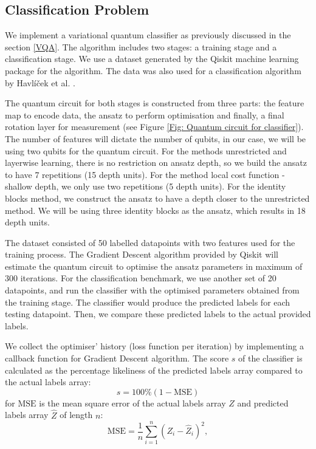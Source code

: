 \subsection{Classification Problem} \label{Sec: Classification Problem}
We implement a variational quantum classifier as previously discussed in the section \ref{VQA}.
The algorithm includes two stages: a training stage and a classification stage.
We use a dataset generated by the Qiskit machine learning package for the algorithm.
The data was also used for a classification algorithm by Havlíček et al. \cite{havlicekSupervisedLearningQuantumenhanced2019}.

The quantum circuit for both stages is constructed from three parts: the feature map to encode data, the ansatz to perform optimisation and finally, a final rotation layer for measurement (see Figure \ref{Fig: Quantum circuit for classifier}).
The number of features will dictate the number of qubits, in our case, we will be using two qubits for the quantum circuit.
For the methods unrestricted and layerwise learning, there is no restriction on ansatz depth, so we build the ansatz to have 7 repetitions (15 depth units).
For the method local cost function - shallow depth, we only use two repetitions (5 depth units).
For the identity blocks method, we construct the ansatz to have a depth closer to the unrestricted method. 
We will be using three identity blocks as the ansatz, which results in 18 depth units.

The dataset consisted of 50 labelled datapoints with two features used for the training process.
The Gradient Descent algorithm provided by Qiskit will estimate the quantum circuit to optimise the ansatz parameters in maximum of 300 iterations.
For the classification benchmark, we use another set of 20 datapoints, and run the classifier with the optimised parameters obtained from the training stage.
The classifier would produce the predicted labels for each testing datapoint.
Then, we compare these predicted labels to the actual provided labels.

We collect the optimiser' history (loss function per iteration) by implementing a callback function for Gradient Descent algorithm.
The score $s$ of the classifier is calculated as the percentage likeliness of the predicted labels array compared to the actual labels array:
\begin{equation}
    s = 100\% (1 - \text{MSE})
\end{equation}
for $\text{MSE}$ is the mean square error of the actual labels array $Z$ and predicted labels array $\hat{Z}$ of length $n$:
\begin{equation}
    \text{MSE} = \frac{1}{n}\sum^n_{i=1}(Z_i - \hat{Z}_i)^2,
\end{equation}



